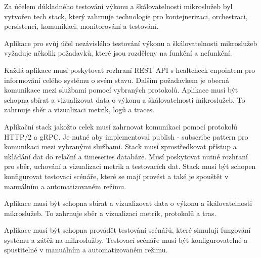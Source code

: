 


Za účelem důkladného testování výkonu a škálovatelnosti mikroslužeb byl vytvořen tech stack, který zahrnuje technologie pro kontejnerizaci, orchestraci, persistenci, komunikaci, monitorování a testování. 


Aplikace pro svůj účel nezávislého testování výkonu a škálovatelnosti mikroslužeb vyžaduje několik požadavků, které jsou rozděleny na funkční a nefunkční.



Každá aplikace musí poskytovat rozhraní REST API s healtcheck enpointem pro informování celého systému o svém stavu. Dalším požadavkem je obecná komunikace mezi službami pomocí vybraných protokolů. Aplikace musí být schopna sbírat a vizualizovat data o výkonu a škálovatelnosti mikroslužeb. To zahrnuje sběr a vizualizaci metrik, logů a traces.



Aplikační stack jakožto celek musí zahrnovat komunikaci pomocí protokolů HTTP/2 a gRPC. Je nutné aby implementoval publish - subscribe pattern pro komunikaci mezi vybranými službami. Stack musí zprostředkovat přístup a ukládání dat do relační a timeseries databáze. Musí poskytovat nutné rozhraní pro sběr, uchování a vizualizaci metrik a testovacích dat. Stack musí být schopen konfigurovat testovací scénáře, které se mají provést a také je spouštět v manuálním a automatizovaném režimu.


Aplikace musí být schopna sbírat a vizualizovat data o výkonu a škálovatelnosti mikroslužeb. To zahrnuje sběr a vizualizaci metrik, protokolů a tras.


Aplikace musí být schopna provádět testování scénářů, které simulují fungování systému a zátěž na mikroslužby. Testovací scénáře musí být konfigurovatelné a spustitelné v manuálním a automatizovaném režimu.


